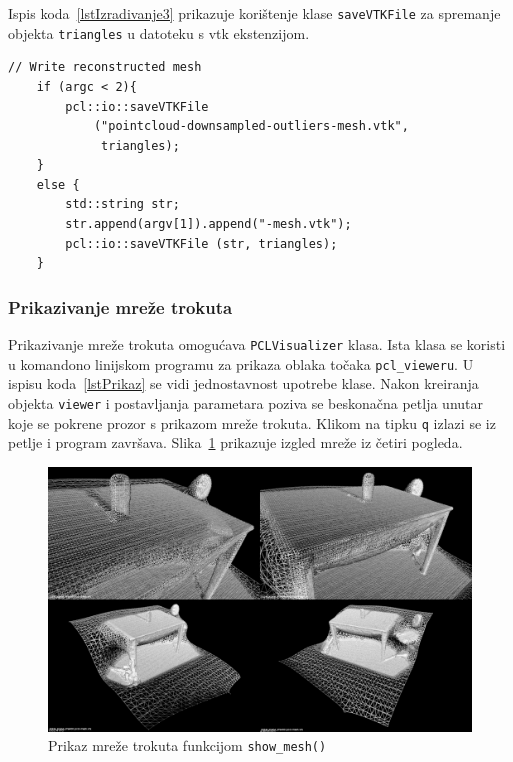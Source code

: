 Ispis koda~\ref{lstIzradivanje3} prikazuje korištenje klase
\texttt{saveVTKFile} za spremanje objekta \texttt{triangles} u datoteku
s vtk ekstenzijom.

\begin{lstlisting}[label=lstIzradivanje3,caption={Dio izvornog koda iz
funkcije \texttt{reconstruct\_mesh()} }]
    // Write reconstructed mesh
    if (argc < 2){
        pcl::io::saveVTKFile
            ("pointcloud-downsampled-outliers-mesh.vtk",
             triangles);
    }
    else {
        std::string str;
        str.append(argv[1]).append("-mesh.vtk");
        pcl::io::saveVTKFile (str, triangles);
    }
\end{lstlisting}


\subsubsection{Prikazivanje mreže trokuta} %
\label{ssub:Prikazivanje mreže trokuta}
Prikazivanje mreže trokuta omogućava \texttt{PCLVisualizer} klasa. Ista
klasa se koristi u komandono linijskom programu za prikaza oblaka točaka
\texttt{pcl\_vieweru}. U ispisu koda~\ref{lstPrikaz} se vidi
jednostavnost upotrebe klase. Nakon kreiranja objekta \texttt{viewer} i
postavljanja parametara poziva se beskonačna petlja unutar koje se
pokrene prozor s prikazom mreže trokuta. Klikom na tipku \texttt{q}
izlazi se iz petlje i program završava.
Slika~\ref{fig:tablesecne-mesh-perspectives} prikazuje izgled mreže iz
četiri pogleda.

\begin{figure}[h]
\centering
\includegraphics[scale=0.25]{figures/tablescene-mesh-perspectives.png}
\caption{Prikaz mreže trokuta funkcijom \texttt{show\_mesh()} }
\label{fig:tablesecne-mesh-perspectives}
\end{figure}

